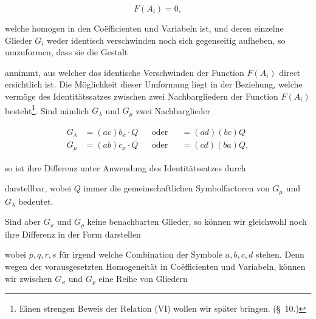 \[ F(A_i) = 0, \]

welche homogen in den Coëfficienten und Variabeln ist, und deren
einzelne Glieder $G_i$ weder identisch verschwinden noch sich gegenseitig
aufheben, so umzuformen, dass sie die Gestalt


annimmt, aus welcher das identische Verschwinden der Function $F(A_i)$
direct ersichtlich ist. Die Möglichkeit dieser Umformung liegt in der
Beziehung, welche vermöge des Identitätssatzes zwischen zwei Nachbargliedern
der Function $F(A_i)$ besteht\footnote{Einen strengen Beweis der Relation (VI) wollen wir später bringen. (\S~10.)}. Sind nämlich $G_\lambda$ und $G_\mu$
zwei Nachbarglieder

\[
\begin{aligned}
G_\lambda &{}= (ac)b_x\cdot Q &&\text{oder} &&{}= (ad)(bc)Q\\
G_\mu &{}= (ab)c_x\cdot Q &&\text{oder} &&{}= (cd)(ba)Q,
\end{aligned}
\]

so ist ihre Differenz unter Anwendung des Identitätssatzes durch



darstellbar, wobei $Q$ immer die gemeinschaftlichen Symbolfactoren von
$G_\mu$ und $G_\lambda$ bedeutet.

Sind aber $G_\varkappa$ und $G_\varrho$ keine benachbarten Glieder, so können wir
gleichwohl noch ihre Differenz in der Form darstellen


wobei $p, q, r, s$ für irgend welche Combination der Symbole $a, b, c, d$
stehen. Denn wegen der vorausgesetzten Homogeneität in Coëfficienten
und Variabeln, können wir zwischen $G_\varkappa$ und $G_\varrho$ eine Reihe von
Gliedern

